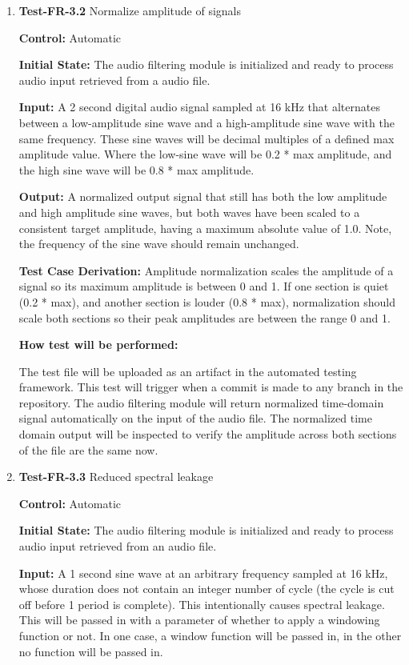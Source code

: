 \documentclass[12pt, titlepage]{article}
\begin{document}
\begin{enumerate}
\item{\textbf{Test-FR-3.2} Normalize amplitude of signals\\}

\textbf{Control:} Automatic
					
\textbf{Initial State:} 
The audio filtering module is initialized and ready to process audio input
retrieved from a audio file. 
					
\textbf{Input:}
A 2 second digital audio signal sampled at 16 kHz that alternates between a
low-amplitude sine wave and a high-amplitude sine wave with the same frequency.
These sine waves will be decimal multiples of a defined max amplitude value.
Where the low-sine wave will be 0.2 * max amplitude, and the high sine wave will
be 0.8 * max amplitude. 
					
\textbf{Output:}
A normalized output signal that still has both the low amplitude and high
amplitude sine waves, but both waves have been scaled to a consistent target
amplitude, having a maximum absolute value of 1.0. Note, the frequency of the
sine wave should remain unchanged. 

\textbf{Test Case Derivation:} 
Amplitude normalization scales the amplitude of a signal so its maximum
amplitude is between 0 and 1. If one section is quiet (0.2 * max), and another
section is louder (0.8 * max), normalization should scale both sections so their
peak amplitudes are between the range 0 and 1. 
					
\textbf{How test will be performed:}

The test file will be uploaded as an artifact in the automated testing
framework. This test will trigger when a commit is made to any branch in the
repository. The audio filtering module will return normalized time-domain signal
automatically on the input of the audio file. The normalized time domain output
will be inspected to verify the amplitude across both sections of the file are
the same now.

\item{\textbf{Test-FR-3.3} Reduced spectral leakage\\}

\textbf{Control:} Automatic
					
\textbf{Initial State:} 
The audio filtering module is initialized and ready to process audio input
retrieved from an audio file. 
					
\textbf{Input:}
A 1 second sine wave at an arbitrary frequency sampled at 16 kHz, whose duration
does not contain an integer number of cycle (the cycle is cut off before 1
period is complete). This intentionally causes spectral leakage. This will be
passed in with a parameter of whether to apply a windowing function or not. In
one case, a window function will be passed in, in the other no function will be
passed in.
					

\end{enumerate}
\end{document}
